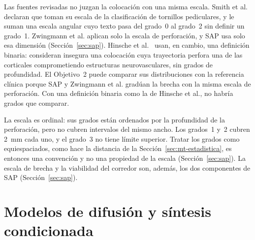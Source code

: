 Las fuentes revisadas no juzgan la colocación con una misma escala. Smith et al. declaran que toman su escala de la clasificación de tornillos pediculares, y le suman una escala angular cuyo texto pasa del grado~0 al grado~2 sin definir un grado~1. Zwingmann et al. aplican solo la escala de perforación, y SAP usa solo esa dimensión (Sección~\ref{sec:sap}). Hinsche et al.~\cite{hinsche2002fluoroscopy} usan, en cambio, una definición binaria: consideran insegura una colocación cuya trayectoria perfora una de las corticales comprometiendo estructuras neurovasculares, sin grados de profundidad. El Objetivo~2 puede comparar sus distribuciones con la referencia clínica porque SAP y Zwingmann et al. gradúan la brecha con la misma escala de perforación. Con una definición binaria como la de Hinsche et al., no habría grados que comparar.

La escala es ordinal: sus grados están ordenados por la profundidad de la perforación, pero no cubren intervalos del mismo ancho. Los grados~1 y~2 cubren 2~mm cada uno, y el grado~3 no tiene límite superior. Tratar los grados como equiespaciados, como hace la distancia de la Sección~\ref{sec:mt-estadistica}, es entonces una convención y no una propiedad de la escala (Sección~\ref{sec:sap}). La escala de brecha y la viabilidad del corredor son, además, los dos componentes de SAP (Sección~\ref{sec:sap}).

\section{Modelos de difusión y síntesis condicionada}\label{sec:mt-difusion}

